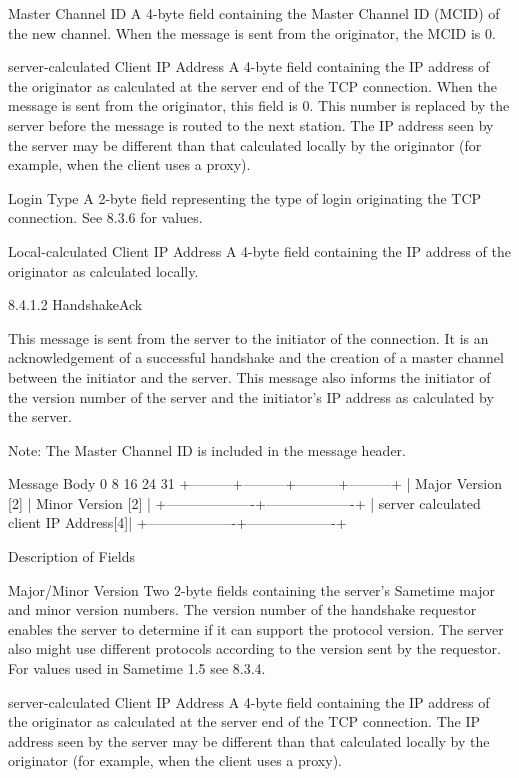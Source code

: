 \documentclass[titlepage,oneside]{book}
\begin{document}
Master Channel ID
  A 4-byte field containing the Master Channel ID (MCID) of the new
  channel. When the message is sent from the originator, the MCID is
  0.

server-calculated Client IP Address
  A 4-byte field containing the IP address of the originator as
  calculated at the server end of the TCP connection. When the message
  is sent from the originator, this field is 0. This number is replaced
  by the server before the message is routed to the next station.
  The IP address seen by the server may be different than that
  calculated locally by the originator (for example, when the client
  uses a proxy).

Login Type
  A 2-byte field representing the type of login originating the TCP
  connection. See 8.3.6 for values.

Local-calculated Client IP Address
  A 4-byte field containing the IP address of the originator as
  calculated locally.


8.4.1.2 HandshakeAck

This message is sent from the server to the initiator of the
connection. It is an acknowledgement of a successful handshake and the
creation of a master channel between the initiator and the server. This
message also informs the initiator of the version number of the server
and the initiator's IP address as calculated by the server.

Note: The Master Channel ID is included in the message header.

Message Body
0         8         16        24      31
+---------+---------+---------+---------+
| Major Version [2] | Minor Version [2] |
+-------------------+-------------------+
| server calculated client IP Address[4]|
+-------------------+-------------------+

Description of Fields

Major/Minor Version
  Two 2-byte fields containing the server's Sametime major and minor
  version numbers. The version number of the handshake requestor
  enables the server to determine if it can support the protocol
  version. The server also might use different protocols according to
  the version sent by the requestor.  For values used in Sametime 1.5
  see 8.3.4.

server-calculated Client IP Address
  A 4-byte field containing the IP address of the originator as
  calculated at the server end of the TCP connection. The IP address
  seen by the server may be different than that calculated locally by
  the originator (for example, when the client uses a proxy).
\end{document}
